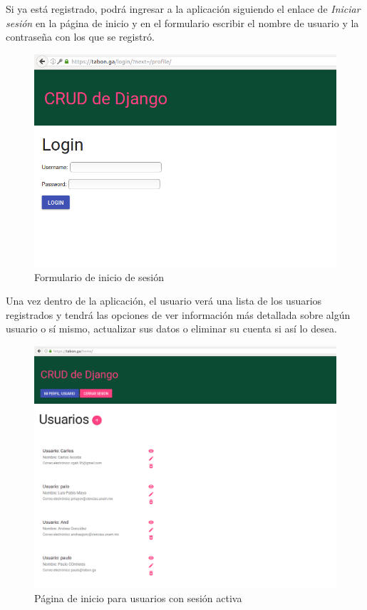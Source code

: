 \documentclass[12pt]{article}
\begin{document}
Si ya está registrado, podrá ingresar a la aplicación siguiendo el enlace de \textit{Iniciar sesión} en la página de inicio y en el formulario escribir el nombre de usuario y la contraseña con los que se registró.
\begin{figure}[H]
  \centering
  \includegraphics[width=\textwidth]{crud/app3}
  \caption{Formulario de inicio de sesión}
\end{figure}


Una vez dentro de la aplicación, el usuario verá una lista de los usuarios registrados y tendrá las opciones de ver información más detallada sobre algún usuario o sí mismo, actualizar sus datos o eliminar su cuenta si así lo desea.\\
\begin{figure}[H]
  \centering
  \includegraphics[width=\textwidth]{crud/app5}
  \caption{Página de inicio para usuarios con sesión activa}
\end{figure}
\end{document}
